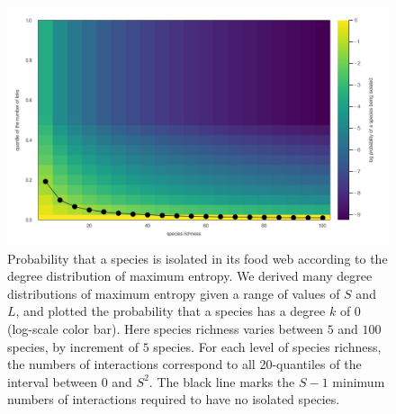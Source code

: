 \documentclass[
  12pt,
]{article}
\begin{document}
\begin{figure}
\hypertarget{fig:heatmap}{%
\centering
\includegraphics{figures/heatmap_disconnected.png}
\caption{Probability that a species is isolated in its food web
according to the degree distribution of maximum entropy. We derived many
degree distributions of maximum entropy given a range of values of \(S\)
and \(L\), and plotted the probability that a species has a degree \(k\)
of \(0\) (log-scale color bar). Here species richness varies between
\(5\) and \(100\) species, by increment of \(5\) species. For each level
of species richness, the numbers of interactions correspond to all
20-quantiles of the interval between \(0\) and \(S^2\). The black line
marks the \(S-1\) minimum numbers of interactions required to have no
isolated species.}\label{fig:heatmap}
}
\end{figure}
\end{document}
